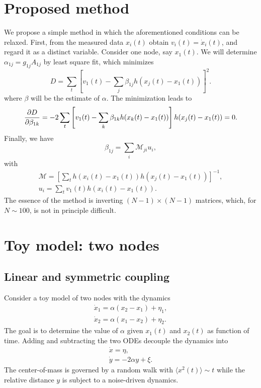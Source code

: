 \documentclass[11pt,a4paper]{article}
\begin{document}
\section{Proposed method}
We propose a simple method in which the aforementioned conditions can be relaxed. First, from the measured data $x_i(t)$ obtain $v_i(t)=\dot{x}_i(t)$, and regard it as a distinct variable. 
Consider one node, say $x_1(t)$. We will determine $\alpha_{1j}=g_{1j}A_{1j}$ by least square fit, which minimizes
\begin{equation}
   D = \sum_{t}\left[ v_1(t)- \sum_j\beta_{1j}h(x_j(t)-x_1(t))\right]^2.
\end{equation}
where $\beta$ will be the estimate of $\alpha$. The minimization leads to
\begin{equation}
   \pdv{D}{\beta_{1k}} = -2\sum_{t}\left[v_1(t)- \sum_k\beta_{1k}h(x_k(t)-x_1(t))\right]h(x_j(t)-x_1(t))=0.
\end{equation}
Finally, we have
\begin{equation}
   \beta_{1j} = \sum_{i}\mathcal{M}_{ji}u_i,
\end{equation}
with
\begin{gather}
    \mathcal{M} = \left[\sum_t h(x_i(t)-x_1(t)) h(x_j(t)-x_1(t))\right]^{-1}, \\
    u_i = \sum_t v_1(t)  h(x_i(t)-x_1(t)).
\end{gather}
The essence of the method is inverting $(N-1)\times(N-1)$ matrices, which, for $N\sim100$, is not in principle difficult. 

\section{Toy model: two nodes}
\subsection{Linear and symmetric coupling}
Consider a toy model of two nodes with the dynamics
\begin{gather}
    \dot{x}_1 = \alpha (x_2-x_1) +\eta_1, \\
    \dot{x}_2 = \alpha (x_1-x_2) +\eta_2.
\end{gather}
The goal is to determine the value of $\alpha$ given $x_1(t)$ and $x_2(t)$ as function of time. Adding and subtracting the two ODEs decouple the dynamics into
\begin{gather}
    \dot{x} = \eta, \\
    \dot{y} = -2\alpha y + \xi.
\end{gather}
The center-of-mass is governed by a random walk with $\langle x^2(t)\rangle \sim t$ while the relative distance $y$ is subject to a noise-driven dynamics. 
\end{document}
